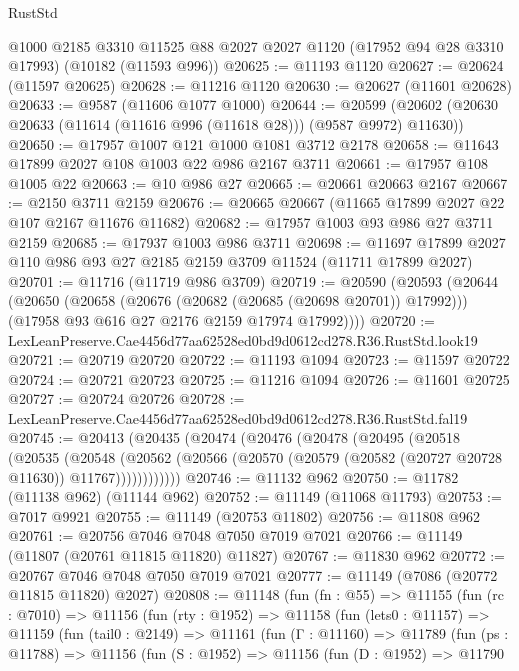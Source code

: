 \begin{lexlean}{RustStd}
\begin{coremodule}
    @1000
    @2185
    @3310
    @11525
    @88
    @2027
    @2027
    @1120
    (@17952 @94 @28 @3310 @17993)
    (@10182 (@11593 @996))
@20625 := @11193 @1120
@20627 := @20624 (@11597 @20625)
@20628 := @11216 @1120
@20630 := @20627 (@11601 @20628)
@20633 := @9587 (@11606 @1077 @1000)
@20644 := @20599 (@20602 (@20630 @20633 (@11614 (@11616 @996 (@11618 @28))) (@9587 @9972) @11630))
@20650 := @17957 @1007 @121 @1000 @1081 @3712 @2178
@20658 := @11643 @17899 @2027 @108 @1003 @22 @986 @2167 @3711
@20661 := @17957 @108 @1005 @22
@20663 := @10 @986 @27
@20665 := @20661 @20663 @2167
@20667 := @2150 @3711 @2159
@20676 := @20665 @20667 (@11665 @17899 @2027 @22 @107 @2167 @11676 @11682)
@20682 := @17957 @1003 @93 @986 @27 @3711 @2159
@20685 := @17937 @1003 @986 @3711
@20698 := @11697 @17899 @2027 @110 @986 @93 @27 @2185 @2159 @3709 @11524 (@11711 @17899 @2027)
@20701 := @11716 (@11719 @986 @3709)
@20719 := @20590
    (@20593
      (@20644
        (@20650
          (@20658 (@20676 (@20682 (@20685 (@20698 @20701)) @17992)))
          (@17958 @93 @616 @27 @2176 @2159 @17974 @17992))))
@20720 := LexLeanPreserve.Cae4456d77aa62528ed0bd9d0612cd278.R36.RustStd.look19
@20721 := @20719 @20720
@20722 := @11193 @1094
@20723 := @11597 @20722
@20724 := @20721 @20723
@20725 := @11216 @1094
@20726 := @11601 @20725
@20727 := @20724 @20726
@20728 := LexLeanPreserve.Cae4456d77aa62528ed0bd9d0612cd278.R36.RustStd.fal19
@20745 := @20413
    (@20435
      (@20474
        (@20476
          (@20478
            (@20495
              (@20518
                (@20535
                  (@20548
                    (@20562
                      (@20566 (@20570 (@20579 (@20582 (@20727 @20728 @11630)) @11767))))))))))))
@20746 := @11132 @962
@20750 := @11782 (@11138 @962) (@11144 @962)
@20752 := @11149 (@11068 @11793)
@20753 := @7017 @9921
@20755 := @11149 (@20753 @11802)
@20756 := @11808 @962
@20761 := @20756 @7046 @7048 @7050 @7019 @7021
@20766 := @11149 (@11807 (@20761 @11815 @11820) @11827)
@20767 := @11830 @962
@20772 := @20767 @7046 @7048 @7050 @7019 @7021
@20777 := @11149 (@7086 (@20772 @11815 @11820) @2027)
@20808 := @11148
    (fun (fn : @55) =>
    @11155
      (fun (rc : @7010) =>
      @11156
        (fun (rty : @1952) =>
        @11158
          (fun (lets0 : @11157) =>
          @11159
            (fun (tail0 : @2149) =>
            @11161
              (fun (Γ : @11160) =>
              @11789
                (fun (ps : @11788) =>
                @11156
                  (fun (S : @1952) =>
                  @11156
                    (fun (D : @1952) =>
                    @11790

\end{coremodule}
\end{lexlean}

